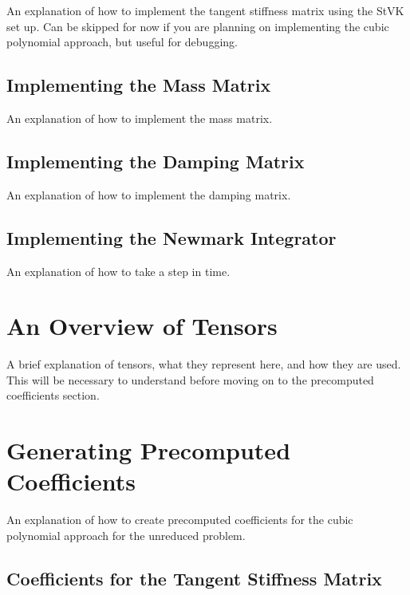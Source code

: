 \documentclass[twocolumn,10pt]{asme2ej}
\begin{document}
An explanation of how to implement the tangent stiffness matrix using the StVK set up. Can be skipped for now if you are
planning on implementing the cubic polynomial approach, but useful for debugging.

\subsection{Implementing the Mass Matrix}

An explanation of how to implement the mass matrix.

\subsection{Implementing the Damping Matrix}

An explanation of how to implement the damping matrix.

\subsection{Implementing the Newmark Integrator}

An explanation of how to take a step in time.

\section{An Overview of Tensors}

A brief explanation of tensors, what they represent here, and how they are used. This will be necessary to understand
before moving on to the precomputed coefficients section.

\section{Generating Precomputed Coefficients}

An explanation of how to create precomputed coefficients for the cubic polynomial approach for the unreduced problem.

\subsection{Coefficients for the Tangent Stiffness Matrix}
\end{document}
